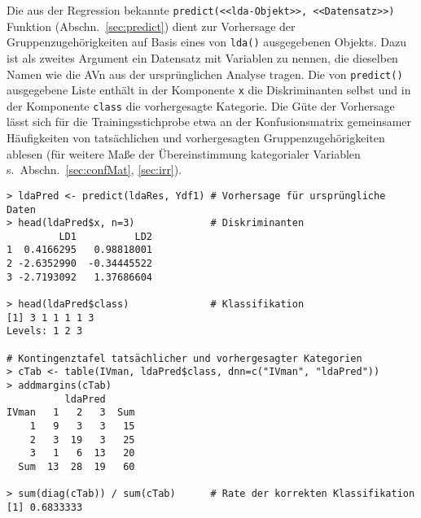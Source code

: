 Die aus der Regression bekannte \lstinline!predict(<<lda-Objekt>>, <<Datensatz>>)! Funktion (Abschn.\ \ref{sec:predict}) dient zur Vorhersage der Gruppenzugehörigkeiten auf Basis eines von \lstinline!lda()! ausgegebenen Objekts. Dazu ist als zweites Argument ein Datensatz mit Variablen zu nennen, die dieselben Namen wie die AVn aus der ursprünglichen Analyse tragen. Die von \lstinline!predict()! ausgegebene Liste enthält in der Komponente \lstinline!x! die Diskriminanten selbst und in der Komponente \lstinline!class! die vorhergesagte Kategorie. Die Güte der Vorhersage lässt sich für die Trainingsstichprobe etwa an der Konfusionsmatrix gemeinsamer Häufigkeiten von tatsächlichen und vorhergesagten Gruppenzugehörigkeiten ablesen (für weitere Maße der Übereinstimmung kategorialer Variablen s.\ Abschn.\ \ref{sec:confMat}, \ref{sec:irr}).
\begin{lstlisting}
> ldaPred <- predict(ldaRes, Ydf1) # Vorhersage für ursprüngliche Daten
> head(ldaPred$x, n=3)             # Diskriminanten
         LD1          LD2
1  0.4166295   0.98818001
2 -2.6352990  -0.34445522
3 -2.7193092   1.37686604

> head(ldaPred$class)              # Klassifikation
[1] 3 1 1 1 1 3
Levels: 1 2 3

# Kontingenztafel tatsächlicher und vorhergesagter Kategorien
> cTab <- table(IVman, ldaPred$class, dnn=c("IVman", "ldaPred"))
> addmargins(cTab)
          ldaPred
IVman   1   2   3  Sum
    1   9   3   3   15
    2   3  19   3   25
    3   1   6  13   20
  Sum  13  28  19   60

> sum(diag(cTab)) / sum(cTab)      # Rate der korrekten Klassifikation
[1] 0.6833333
\end{lstlisting}

